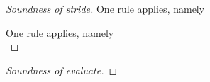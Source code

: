 \begin{proof}[Soundness of stride]
 {One rule applies, namely \\

%
%
}

{One rule applies, namely \\
%
%

}

\end{proof}

\begin{proof}[Soundness of evaluate]

\end{proof}
